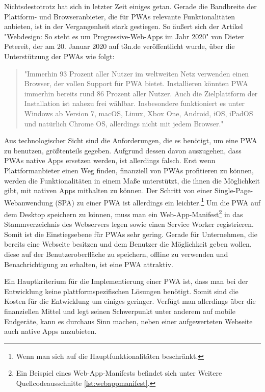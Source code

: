Nichtsdestotrotz hat sich in letzter Zeit einiges getan.
Gerade die Bandbreite der Plattform- und Browseranbieter, die für PWAs relevante
Funktionalitäten anbieten, ist in der Vergangenheit stark gestiegen. So äußert sich der Artikel
"Webdesign: So steht es um Progressive-Web-Apps im Jahr 2020" von Dieter Petereit,
der am 20. Januar 2020 auf t3n.de veröffentlicht wurde, über die Unterstützung der PWAs wie folgt:

\begin{quote}
"Immerhin 93 Prozent aller Nutzer im weltweiten Netz verwenden einen Browser, der vollen Support
für PWA bietet. Installieren könnten PWA immerhin bereits rund 86 Prozent aller Nutzer. Auch
die Zielplattform der Installation ist nahezu frei wählbar. Insbesondere funktioniert es
unter Windows ab Version 7, macOS, Linux, Xbox One, Android, iOS, iPadOS und natürlich Chrome OS,
allerdings nicht mit jedem Browser."\cite{T3NPWASupport}
\end{quote}

Aus technologischer Sicht sind die
Anforderungen, die es benötigt, um eine PWA zu benutzen, größtenteils gegeben.
Aufgrund dessen davon auszugehen, dass PWAs native Apps ersetzen werden, ist allerdings
falsch. Erst wenn Plattformanbieter einen Weg finden, finanziell von PWAs profitieren
zu können, werden die Funktionalitäten in einem Maße unterstützt, die ihnen die Möglichkeit
gibt, mit nativen Apps mithalten zu können. Der Schritt von einer Single-Page-Webanwendung (SPA) zu einer
PWA ist allerdings ein leichter.\footnote{Wenn man sich auf die Hauptfunktionalitäten beschränkt.}
Um die PWA auf dem Desktop speichern zu können, muss man ein Web-App-Manifest\footnote{
Ein Beispiel eines Web-App-Manifests befindet sich unter Weitere Quellcodeausschnitte \ref{lst:webappmanifest}.}
in das Stammverzeichnis des Webservers legen sowie einen Service Worker registrieren.
Somit ist die Einstiegsebene für PWAs sehr gering. Gerade für Unternehmen,
die bereits eine Webseite besitzen und dem Benutzer die Möglichkeit geben wollen,
diese auf der Benutzeroberfläche zu speichern, offline zu verwenden und Benachrichtigung zu erhalten,
ist eine PWA attraktiv.

Ein Hauptkriterium für die Implementierung einer PWA ist, dass man bei der Entwicklung
keine plattformspezifischen Lösungen benötigt. Somit sind die Kosten für die Entwicklung um einiges
geringer. Verfügt man allerdings über die finanziellen Mittel und legt seinen Schwerpunkt unter anderem
auf mobile Endgeräte, kann es durchaus Sinn machen, neben einer aufgewerteten Webseite
auch native Apps anzubieten.

